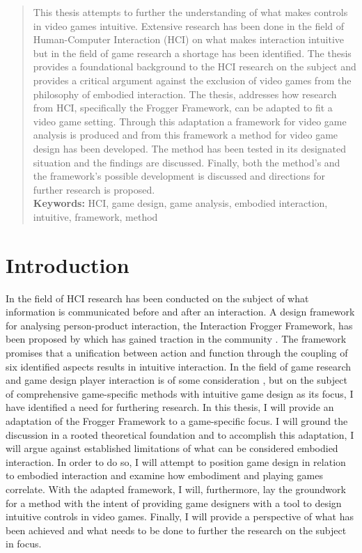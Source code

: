 \begin{abstract}
  This thesis attempts to further the understanding of what makes controls in video games intuitive. Extensive research has been done in the field of Human-Computer Interaction (HCI) on what makes interaction intuitive but in the field of game research a shortage has been identified. The thesis provides a foundational background to the HCI research on the subject and provides a critical argument against the exclusion of video games from the philosophy of embodied interaction. The thesis, addresses how research from HCI, specifically the Frogger Framework, can be adapted to fit a video game setting. Through this adaptation a framework for video game analysis is produced and from this framework a method for video game design has been developed. The method has been tested in its designated situation and the findings are discussed. Finally, both the method's and the framework's possible development is discussed and directions for further research is proposed. \\ \textbf{Keywords:} HCI, game design, game analysis, embodied interaction, intuitive, framework, method
\end{abstract}


\section*{Introduction}
In the field of HCI research has been conducted on the subject of what information is communicated before and after an interaction. A design framework for analysing person-product interaction, the Interaction Frogger Framework, has been proposed by  which has gained traction in the community \cite{transbehav, tangifrog, vermeulen, rthroughd, move, easy}. The framework promises that a unification between action and function through the coupling of six identified aspects results in intuitive interaction. In the field of game research and game design player interaction is of some consideration \cite{salen, fullerton, schell, adams, agustin}, but on the subject of comprehensive game-specific methods with intuitive game design as its focus, I have identified a need for furthering research. In this thesis, I will provide an adaptation of the Frogger Framework to a game-specific focus. I will ground the discussion in a rooted theoretical foundation and to accomplish this adaptation, I will argue against established limitations \cite{dourish} of what can be considered embodied interaction. In order to do so, I will attempt to position game design in relation to embodied interaction and examine how embodiment and playing games correlate. With the adapted framework, I will, furthermore, lay the groundwork for a method with the intent of providing game designers with a tool to design intuitive controls in video games. Finally, I will provide a perspective of what has been achieved and what needs to be done to further the research on the subject in focus.

